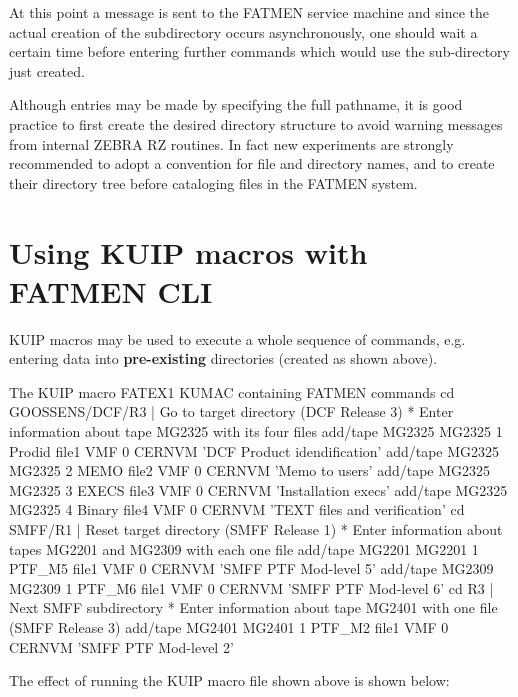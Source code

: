 At this point a message is sent to the FATMEN
service machine and since the actual creation of the subdirectory
occurs asynchronously, one should wait a certain time before entering
further commands which would use the sub-directory just created.
\par
Although entries may be made by specifying the full pathname, it
is good practice to first create the desired directory structure to
avoid warning messages from internal ZEBRA RZ routines.
In fact new experiments are strongly recommended to adopt a convention
for file and directory names, and to create their directory tree before
cataloging files in the FATMEN system.
 
\section{Using KUIP macros with FATMEN CLI}

KUIP macros may be used to execute a whole sequence of commands,
e.g. entering data into {\bf pre-existing}
directories (created as shown above).

\begin{XMPt}{The KUIP macro FATEX1 KUMAC containing FATMEN commands}
cd GOOSSENS/DCF/R3             | Go to target directory (DCF Release 3)
*   Enter information about tape MG2325 with its four files
add/tape MG2325 MG2325 1 Prodid file1 VMF 0 CERNVM 'DCF Product idendification'
add/tape MG2325 MG2325 2 MEMO   file2 VMF 0 CERNVM 'Memo to users'
add/tape MG2325 MG2325 3 EXECS  file3 VMF 0 CERNVM 'Installation execs'
add/tape MG2325 MG2325 4 Binary file4 VMF 0 CERNVM 'TEXT files and verification'
cd \bs \bs SMFF/R1         | Reset target directory (SMFF Release 1)
*   Enter information about tapes MG2201 and MG2309 with each one file
add/tape MG2201 MG2201 1 PTF_M5 file1 VMF 0 CERNVM 'SMFF PTF Mod-level 5'
add/tape MG2309 MG2309 1 PTF_M6 file1 VMF 0 CERNVM 'SMFF PTF Mod-level 6'
cd \bs R3                    | Next SMFF subdirectory
*   Enter information about tape MG2401 with one file   (SMFF Release 3)
add/tape MG2401 MG2401 1 PTF_M2 file1 VMF 0 CERNVM 'SMFF PTF Mod-level 2'
\end{XMPt}

The effect of running the KUIP macro file shown above is shown below:

